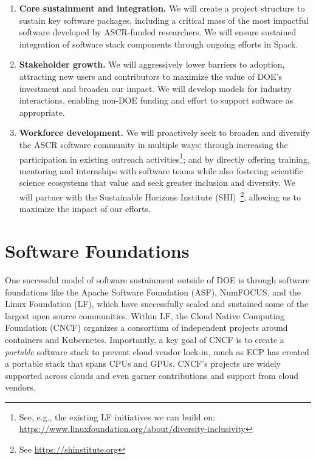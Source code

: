 \documentclass[11pt]{article}
\begin{document}
\begin{enumerate}

\item {\bf Core sustainment and integration.} We will create a project structure to sustain key
    software packages, including a critical mass of the most impactful software developed
    by ASCR-funded researchers.  We will ensure sustained integration of software stack components
    through ongoing efforts in Spack.

\item {\bf Stakeholder growth.} We will aggressively lower barriers to adoption, attracting new
    users and contributors to maximize the value of DOE's investment and broaden our
    impact.  We will develop models for industry interactions,
    enabling non-DOE funding and effort to support software as appropriate.

\item {\bf Workforce development.} We will proactively seek to broaden and diversify the
    ASCR software community in multiple ways: through increasing the participation in
    existing outreach activities\footnote{See, e.g., the existing LF initiatives we can build on:
  \href{https://www.linuxfoundation.org/about/diversity-inclusivity}{https://www.linuxfoundation.org/about/diversity-inclusivity}};
     and by directly offering training,
     mentoring and internships with software teams while also fostering scientific
     science ecosystems that value and seek greater inclusion and diversity.  We will partner with the
     Sustainable Horizons Institute (SHI)~\footnote{See \href{https://shinstitute.org}{https://shinstitute.org}},
     allowing us to maximize the impact of our efforts.
\end{enumerate}


\section{Software Foundations}

One successful model of software sustainment outside of DOE is through software
foundations like the Apache Software Foundation (ASF), NumFOCUS, and the Linux
Foundation (LF), which have successfully scaled and sustained some of the largest open
source communities. Within LF, the Cloud Native Computing Foundation (CNCF) organizes a
consortium of independent projects around containers and Kubernetes. Importantly, a key
goal of CNCF is to create a {\it portable} software stack to prevent cloud vendor
lock-in, much as ECP has created a portable stack that spans CPUs and GPUs. CNCF's projects are
widely supported across clouds and even garner contributions and support from cloud
vendors.
\end{document}
